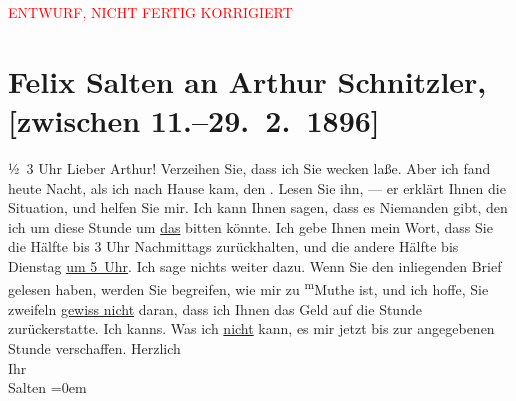 
\begin{center}
            \textcolor{red}{ENTWURF, NICHT FERTIG KORRIGIERT}
                      \end{center}
            
         \renewcommand{\erwaehnteOrte}{Orte: Wien}
         \renewcommand{\erwaehnteWerke}{}
               \section[Felix Salten an Arthur Schnitzler, {[}zwischen 11.–29. 2. 1896{]}]{ Felix Salten an Arthur Schnitzler, {[}zwischen 11.–29. 2. 1896{]}}\nopagebreak{}\rehead{ }\begin{ledgroupsized}[t]{13cm}\normalsize\beginnumbering \toendnotes[C]{\smallbreak\pagebreak[2]} 
\toendnotes[C]{\smallbreak}\pstart
           \raggedleft{}{\pb}½ 3 Uhr\pend
           \pstart
           Lieber Arthur! Verzeihen Sie, dass ich Sie wecken laße. Aber ich
               fand heute Nacht, als ich nach Hause kam, den \label{K_L03168-1v}\label{K_L03168-1h}. Lesen Sie ihn, — er erklärt Ihnen die Situation,
               und helfen Sie mir. Ich kann Ihnen sagen, dass es Niemanden gibt, den ich um diese
               Stunde um \uline{das} bitten könnte. Ich gebe Ihnen mein
               Wort, dass Sie die Hälfte bis 3 Uhr Nachmittags zurückhalten, und die andere Hälfte
               bis Dienstag {\pb}\uline{um 5 Uhr}. Ich sage nichts weiter dazu. Wenn Sie den
               inliegenden Brief gelesen haben, werden Sie begreifen, wie mir zu \substVorne{}\textsuperscript{m}\substDazwischen{}M\substHinten{}uthe ist, und ich hoffe, Sie zweifeln \uline{gewiss
                  nicht} daran, dass ich Ihnen das Geld auf die Stunde zurückerstatte. Ich
               kanns. Was ich \uline{nicht} kann, es mir jetzt bis zur
               angegebenen Stunde verschaffen.\pend
           \pstart
           Herzlich{\\[\baselineskip]}Ihr{\\[\baselineskip]}\spacefill\mbox{Salten}\pend
           \leftskip=0em{}
         
         \endnumbering{}\end{ledgroupsized}\begin{anhang}\end{anhang}\newcommand{\dateiname}{L03168}\newcommand{\titel}{Felix Salten an Arthur Schnitzler, [zwischen 11.–29. 2. 1896]}\newcommand{\editorInnen}{Martin Anton Müller und Laura Untner}
      